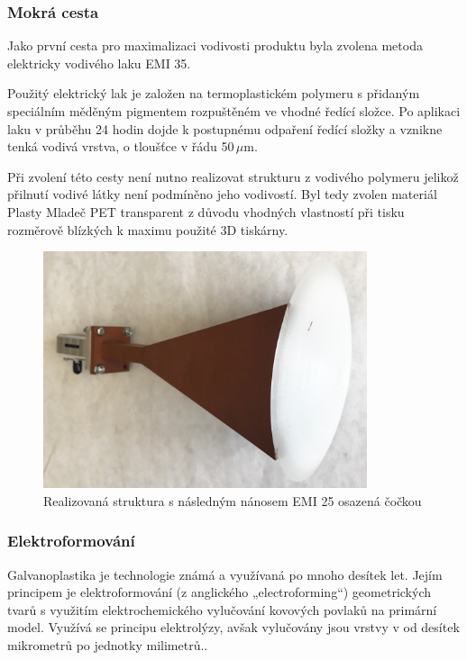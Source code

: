 \subsubsection{Mokrá cesta}
Jako první cesta pro maximalizaci vodivosti produktu byla zvolena metoda elektricky vodivého laku EMI 35\cite{EMIdata}.

Použitý elektrický lak je založen na termoplastickém polymeru s přidaným speciálním měděným pigmentem rozpuštěném ve vhodné ředící složce. Po aplikaci laku v průběhu 24 hodin dojde k postupnému odpaření ředící složky a vznikne tenká vodivá vrstva, o tloušťce v řádu 50\,$\mu$m.

Při zvolení této cesty není nutno realizovat strukturu z vodivého polymeru jelikož přilnutí vodivé látky není podmíněno jeho vodivostí. Byl tedy zvolen materiál Plasty Mladeč PET transparent z důvodu vhodných vlastností při tisku rozměrově blízkých k maximu použité 3D tiskárny.


\begin{figure}[!htbp]
\begin{center}
\includegraphics[width=9.5cm]{pics/final/Assembly}
\caption{Realizovaná struktura s následným nánosem EMI 25 osazená čočkou}
\label{fig:HornEMI}
\end{center}
\end{figure}

\subsubsection{Elektroformování}
Galvanoplastika je technologie známá a využívaná po mnoho desítek let. Jejím principem je elektroformování (z anglického „electroforming“) geometrických tvarů s využitím elektrochemického vylučování kovových povlaků na primární model. Využívá se principu elektrolýzy, avšak vylučovány jsou vrstvy v od desítek mikrometrů po jednotky milimetrů.\cite{Electroforming}.

